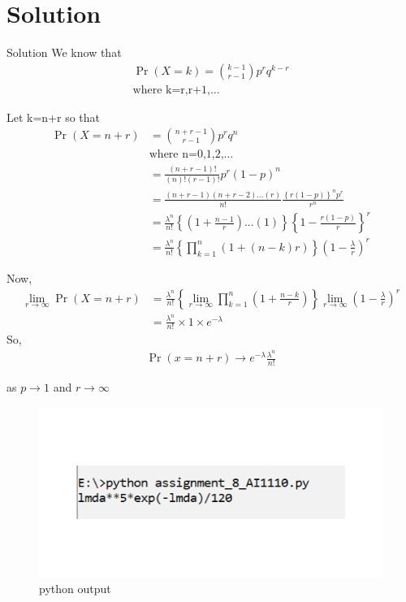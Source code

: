 \documentclass{beamer}
\providecommand{\brak}[1]{\ensuremath{\left(#1\right)}}
\providecommand{\cbrak}[1]{\ensuremath{\left\{#1\right\}}}
\begin{document}
\section{Solution}
\begin{frame}{Solution}
We know that
\begin{align}
    \Pr\brak{X=k}=\binom{k-1}{r-1}p^rq^{k-r}
   \\ \text{where k=r,r+1,...}\nonumber
\end{align}



   \end{frame}
\begin{frame}
Let k=n+r so that
\begin{align}
 \Pr\brak{X=n+r}&=\binom{n+r-1}{r-1}p^r q^{n}    \nonumber\\
&\text{where n=0,1,2,...}\nonumber\\
  & =\frac{\brak{n+r-1}!}{\brak{n}!\brak{r-1}!}p^r\brak{1-p}^n  \nonumber\\
   & =\frac{(n+r-1)(n+r-2)...(r)}{n!}\frac{\cbrak{r(1-p)}^n p^r}{r^n}  \nonumber\\
   & =\frac{\lambda^n}{n!}\cbrak{\brak{1+\frac{n-1}{r}}...\brak{1}}\cbrak{1-\frac{r\brak{1-p}}{r}}^r   \nonumber\\
   & =\frac{\lambda^n}{n!}\cbrak{\prod_{k=1}^{n}\brak{1+\brak{n-k}{r}}}\brak{1-\frac{\lambda}{r}}^r
\end{align}
    
\end{frame}
\begin{frame}
    Now,
    \begin{align}
        \lim_{r\to \infty}\Pr\brak{X=n+r}&=\frac{\lambda^n}{n!}\cbrak{\lim_{r\to\infty}\prod_{k=1}^{n}\brak{1+\frac{n-k}{r}}}\lim_{r\to\infty}\brak{1-\frac{\lambda}{r}}^r     \nonumber  \\
        &=\frac{\lambda^n}{n!}\times1\times e^{-\lambda}
    \end{align}
    So,
    \begin{align}
         \Pr\brak{x=n+r}\to e^{-\lambda}\frac{\lambda^n}{n!} 
  \nonumber
    \end{align}
\centerline{ as $p \to 1$ 
and $r\to \infty$}
\end{frame}
\begin{frame}
    \begin{figure}[htb!]

\includegraphics[width=13cm]{figures/assign_8_python.png}
\caption{python output}
\end{figure}
\end{frame}
\end{document}
